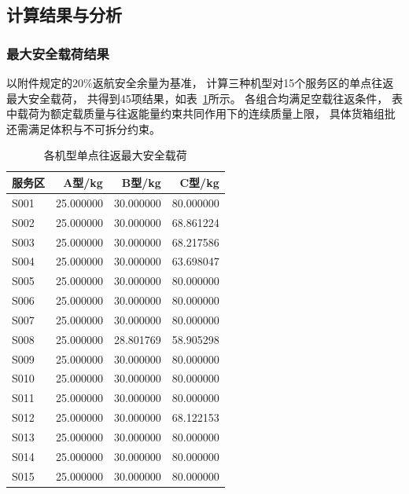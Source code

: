 \documentclass[bwprint]{gmcmthesis}
\begin{document}
\subsection{计算结果与分析}

\subsubsection{最大安全载荷结果}

以附件规定的$20\%$返航安全余量为基准，
计算三种机型对15个服务区的单点往返最大安全载荷，
共得到45项结果，如表~\ref{tab:q1_safe_payload}所示。
各组合均满足空载往返条件，
表中载荷为额定载质量与往返能量约束共同作用下的连续质量上限，
具体货箱组批还需满足体积与不可拆分约束。

\begin{table}[H]
    \centering
    \caption{各机型单点往返最大安全载荷}
    \label{tab:q1_safe_payload}
    \begin{tabular}{lrrr}
        \toprule
        服务区 & A型/kg & B型/kg & C型/kg \\
        \midrule
        S001 & 25.000000 & 30.000000 & 80.000000 \\
        S002 & 25.000000 & 30.000000 & 68.861224 \\
        S003 & 25.000000 & 30.000000 & 68.217586 \\
        S004 & 25.000000 & 30.000000 & 63.698047 \\
        S005 & 25.000000 & 30.000000 & 80.000000 \\
        S006 & 25.000000 & 30.000000 & 80.000000 \\
        S007 & 25.000000 & 30.000000 & 80.000000 \\
        S008 & 25.000000 & 28.801769 & 58.905298 \\
        S009 & 25.000000 & 30.000000 & 80.000000 \\
        S010 & 25.000000 & 30.000000 & 80.000000 \\
        S011 & 25.000000 & 30.000000 & 80.000000 \\
        S012 & 25.000000 & 30.000000 & 68.122153 \\
        S013 & 25.000000 & 30.000000 & 80.000000 \\
        S014 & 25.000000 & 30.000000 & 80.000000 \\
        S015 & 25.000000 & 30.000000 & 80.000000 \\
        \bottomrule
    \end{tabular}
\end{table}
\end{document}
